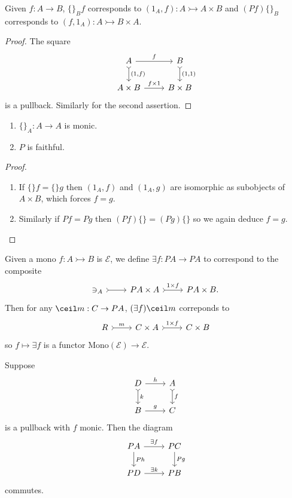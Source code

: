 \documentclass[a4paper]{article}
\newcommand{\mono}{\rightarrowtail}
\begin{document}
\begin{lemma}
  Given \(f: A \to B\), \(\{\}_Bf\) corresponds to \((1_A, f): A \mono A \times B\) and \((Pf) \{\}_B\) corresponds to \((f, 1_A): A \mono B \times A\).
\end{lemma}

\begin{proof}
  The square
  \[
    \begin{tikzcd}
      A \ar[r, "f"] \ar[d, "{(1, f)}", tail] & B \ar[d, "{(1, 1)}", tail] \\
      A \times B \ar[r, "f \times 1"] & B \times B
    \end{tikzcd}
  \]
  is a pullback. Similarly for the second assertion.
\end{proof}

\begin{corollary}\leavevmode
  \begin{enumerate}
  \item \(\{\}_A: A \to A\) is monic.
  \item \(P\) is faithful.
  \end{enumerate}
\end{corollary}

\begin{proof}\leavevmode
  \begin{enumerate}
  \item If \(\{\}f = \{\}g\) then \((1_A, f)\) and \((1_A, g)\) are isomorphic as subobjects of \(A \times B\), which forces \(f = g\).
  \item Similarly if \(Pf = Pg\) then \((Pf)\{\} = (Pg)\{\}\) so we again deduce \(f = g\).
  \end{enumerate}
\end{proof}

Given a mono \(f: A \mono B\) is \(\mathcal E\), we define \(\exists f: PA \to PA\) to correspond to the composite
\[
  \begin{tikzcd}
    \ni_A \ar[r, tail] & PA \times A \ar[r, "1 \times f", tail] & PA \times B.
  \end{tikzcd}
\]
Then for any \(\ceil m: C \to PA\), \((\exists f) \ceil m\) correponds to
\[
  \begin{tikzcd}
    R \ar[r, "m", tail] & C \times A \ar[r, "1 \times f", tail] & C \times B
  \end{tikzcd}
\]
so \(f \mapsto \exists f\) is a functor \(\text{Mono}(\mathcal E) \to \mathcal E\).

\begin{lemma}
  Suppose
  \[
    \begin{tikzcd}
      D \ar[r, "h"] \ar[d, "k", tail] & A \ar[d, "f", tail] \\
      B \ar[r, "g"] & C
    \end{tikzcd}
  \]
  is a pullback with \(f\) monic. Then the diagram
  \[
    \begin{tikzcd}
      PA \ar[r, "\exists f"] \ar[d, "Ph"] & PC \ar[d, "Pg"] \\
      PD \ar[r, "\exists k"] & PB
    \end{tikzcd}
  \]
  commutes.
\end{lemma}
\end{document}
